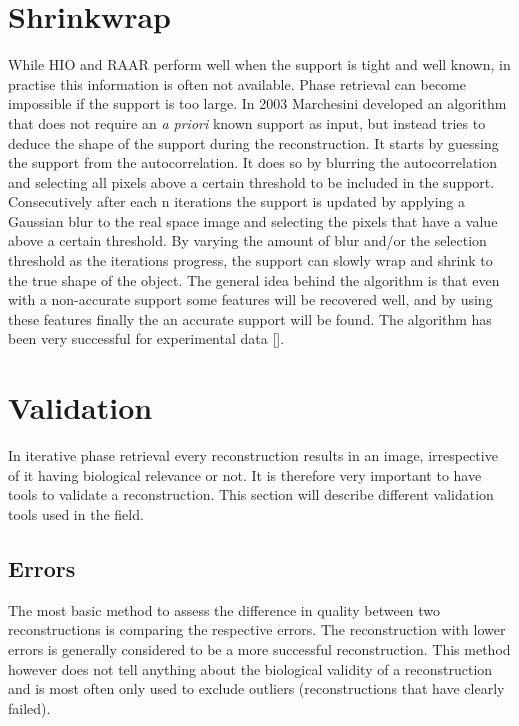 \section{Shrinkwrap}
While HIO and RAAR perform well when the support is tight and well known, in practise this information is often not available. Phase retrieval can become impossible if the support is too large. In 2003 Marchesini developed an algorithm that does not require an \textit{a priori} known support as input, but instead tries to deduce the shape of the support during the reconstruction. It starts by guessing the support from the autocorrelation. It does so by blurring the autocorrelation and selecting all pixels above a certain threshold to be included in the support. Consecutively after each n iterations the support is updated by applying a Gaussian blur to the real space image and selecting the pixels that have a value above a certain threshold. By varying the amount of blur and/or the selection threshold as the iterations progress, the support can slowly wrap and shrink to the true shape of the object. The general idea behind the algorithm is that even with a non-accurate support some features will be recovered well, and by using these features finally the an accurate support will be found. The algorithm has been very successful for experimental data [].

\section{Validation}
In iterative phase retrieval every reconstruction results in an image, irrespective of it having biological relevance or not. It is therefore very important to have tools to validate a reconstruction. This section will describe different validation tools used in the field.

\subsection{Errors}
The most basic method to assess the difference in quality between two reconstructions is comparing the respective errors. The reconstruction with lower errors is generally considered to be a more successful reconstruction. This method however does not tell anything about the biological validity of a reconstruction and is most often only used to exclude outliers (reconstructions that have clearly failed).
 
